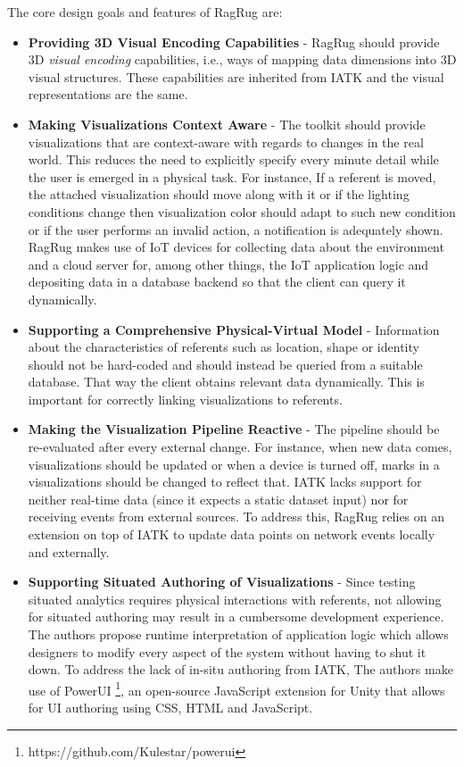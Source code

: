 \documentclass{vgtc}                          %
\begin{document}
\noindent The core design goals and features of RagRug are:
\begin{itemize}
	\item \textbf{Providing 3D Visual Encoding Capabilities} -
	      RagRug should provide 3D \textit{visual encoding} capabilities, i.e.,
	      ways of mapping data dimensions into 3D visual structures. These
	      capabilities are inherited from IATK and the visual representations
	      are the same.
	\item \textbf{Making Visualizations Context Aware} -
	      The toolkit should provide visualizations that are context-aware with
	      regards to changes in the real world. This reduces the need to
	      explicitly specify every minute detail while the user is emerged in
	      a physical task. For instance, If a referent is moved, the attached
	      visualization should move along with it or if the lighting conditions
	      change then visualization color should adapt to such new condition
	      or if the user performs an invalid action, a notification is
	      adequately shown. RagRug makes use of IoT devices for collecting data
	      about the environment and a cloud server for, among other things, the
	      IoT application logic and depositing data in a database backend
	      so that the client can query it dynamically.
	\item \textbf{Supporting a Comprehensive Physical-Virtual Model} -
	      Information about the characteristics of referents such as location,
	      shape or identity should not be hard-coded and should instead be
	      queried from a suitable database. That way the client obtains
	      relevant data dynamically. This is important for correctly linking
	      visualizations to referents.
	\item \textbf{Making the Visualization Pipeline Reactive} -
	      The pipeline should be re-evaluated after every external change. For
	      instance, when new data comes, visualizations should be updated or
	      when a device is turned off, marks in a visualizations should be
	      changed to reflect that. IATK lacks support for neither real-time
	      data (since it expects a static dataset input) nor for receiving
	      events from external sources. To address this, RagRug relies on an
	      extension on top of IATK to update data points on network events
	      locally and externally.
	\item \textbf{Supporting Situated Authoring of Visualizations} -
	      Since testing situated analytics requires physical interactions with
	      referents, not allowing for situated authoring may result in a
	      cumbersome development experience. The authors propose runtime
	      interpretation of application logic which allows designers to modify
	      every aspect of the system without having to shut it down. To address
	      the lack of in-situ authoring from IATK, The authors make use of
	      PowerUI \footnote{https://github.com/Kulestar/powerui}, an
	      open-source JavaScript extension for Unity that allows for UI
	      authoring using CSS, HTML and JavaScript.
\end{itemize}
\end{document}
